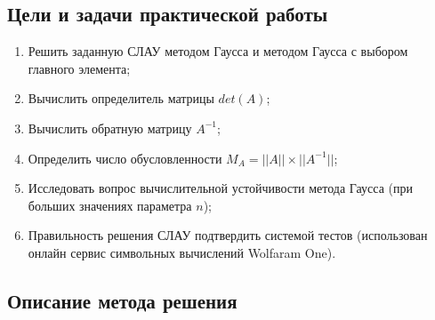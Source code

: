 \documentclass[a4paper,12pt,titlepage,finall]{article}
\begin{document}
\subsection{Цели и задачи практической работы}

\begin{enumerate}
\item
Решить заданную СЛАУ методом Гаусса и методом Гаусса с выбором главного
элемента;
\item
Вычислить определитель матрицы $det(A)$;
\item
Вычислить обратную матрицу $A^{-1}$;
\item
Определить число обусловленности $M_A=||A|| \times ||A^{-1}||$;
\item
Исследовать вопрос вычислительной устойчивости метода Гаусса (при больших
значениях параметра $n$);
\item
Правильность решения СЛАУ подтвердить системой тестов (использован онлайн сервис символьных вычислений Wolfaram One).
\end{enumerate}

\newpage
\subsection{Описание метода решения}
\end{document}
